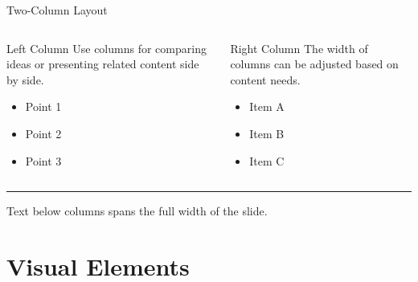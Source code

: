 \documentclass[aspectratio=169]{beamer}
\newcommand{\separator}{\begin{center}\rule{0.5\linewidth}{0.5pt}\end{center}}
\begin{document}
\begin{frame}[fragile]{Two-Column Layout}
  \begin{columns}
    \begin{column}{0.48\textwidth}
      \begin{block}{Left Column}
        Use columns for comparing ideas or presenting related content side by side.
        \begin{itemize}
          \item Point 1
          \item Point 2
          \item Point 3
        \end{itemize}
      \end{block}
    \end{column}
    
    \begin{column}{0.48\textwidth}
      \begin{block}{Right Column}
        The width of columns can be adjusted based on content needs.
        \begin{itemize}
          \item Item A
          \item Item B
          \item Item C
        \end{itemize}
      \end{block}
    \end{column}
  \end{columns}
  
  \separator
  
  Text below columns spans the full width of the slide.
\end{frame}

\section{Visual Elements}
\end{document}
